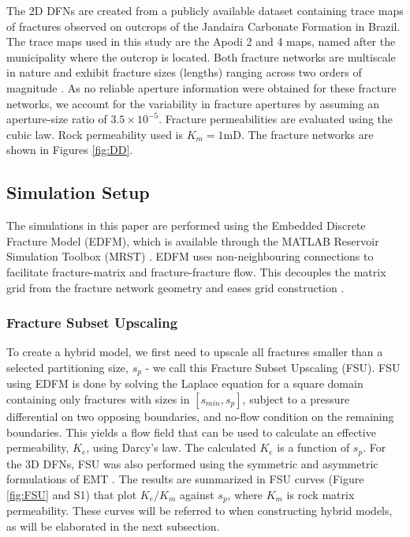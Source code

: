 \documentclass[draft]{agujournal2018}
\begin{document}
The 2D DFNs are created from a publicly available dataset containing trace maps of fractures observed on outcrops of the Jandaira Carbonate Formation in Brazil. The trace maps used in this study are the Apodi 2 and 4 maps, named after the municipality where the outcrop is located. Both fracture networks are multiscale in nature and exhibit fracture sizes (lengths) ranging across two orders of magnitude \citep{Bisdom2015}. As no reliable aperture information were obtained for these fracture networks, we account for the variability in fracture apertures by assuming an aperture-size ratio of $3.5\times 10^{-5}$. Fracture permeabilities are evaluated using the cubic law. Rock permeability used is $K_m=1$mD. The fracture networks are shown in Figures \ref{fig:DD}.


\subsection{Simulation Setup}
The simulations in this paper are performed using the Embedded Discrete Fracture Model (EDFM), which is available through the MATLAB Reservoir Simulation Toolbox (MRST) \citep{Lie2012}. EDFM uses non-neighbouring connections to facilitate fracture-matrix and fracture-fracture flow. This decouples the matrix grid from the fracture network geometry and eases grid construction \citep{Lee2001, Li2008, Moinfar2014, Shah2016}. 

\subsubsection{Fracture Subset Upscaling}
To create a hybrid model, we first need to upscale all fractures smaller than a selected partitioning size, $s_p$ - we call this Fracture Subset Upscaling (FSU). FSU using EDFM is done by solving the Laplace equation for a square domain containing only fractures with sizes in $[s_{min},s_p]$, subject to a pressure differential on two opposing boundaries, and no-flow condition on the remaining boundaries. This yields a flow field that can be used to calculate an effective permeability, $K_{e}$, using Darcy's law. The calculated $K_{e}$ is a function of $s_p$. For the 3D DFNs, FSU was also performed using the symmetric and asymmetric formulations of EMT \citep{Saevik2013}. The results are summarized in FSU curves (Figure \ref{fig:FSU} and S1) that plot $K_{e}/K_m$ against $s_p$, where $K_m$ is rock matrix permeability. These curves will be referred to when constructing hybrid models, as will be elaborated in the next subsection.
\end{document}
